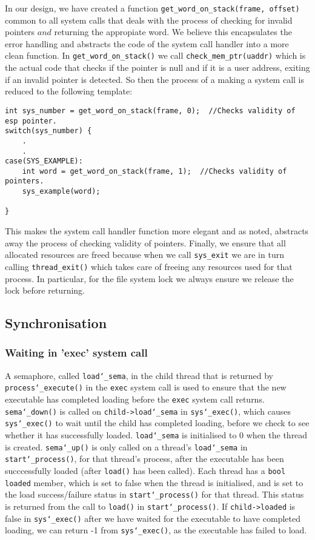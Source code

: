 \documentclass{article}
\renewcommand{\_}{\char`_}
\begin{document}
In our design, we have created a function  \lstinline{get_word_on_stack(frame, offset)} common to all system calls that deals with the process of checking for invalid pointers $and$ returning the appropiate word. We believe this encapsulates the error handling and abstracts the code of the system call handler into a more clean function. In \lstinline{get_word_on_stack()} we call \lstinline{check_mem_ptr(uaddr)} which is the actual code that checks if the pointer is null and if it is a user address, exiting if an invalid pointer is detected. So then the process of a making a system call is reduced to the following template:

\begin{lstlisting}
int sys_number = get_word_on_stack(frame, 0);  //Checks validity of esp pointer.
switch(sys_number) {
	.
	.
case(SYS_EXAMPLE):
	int word = get_word_on_stack(frame, 1);  //Checks validity of pointers.
	sys_example(word);

}
\end{lstlisting}

This makes the system call handler function more elegant and as noted, abstracts away the process of checking validity of pointers. Finally, we ensure that all allocated resources are freed because when we call \lstinline{sys_exit} we are in turn calling \lstinline{thread_exit()} which takes care of freeing any resources used for that process. In particular, for the file system lock we always ensure we release the lock before returning.

\subsection{Synchronisation}

\subsubsection{Waiting in 'exec' system call}

A semaphore, called \texttt{load\_sema}, in the child thread that is returned by \texttt{process\_execute()} in the \texttt{exec} system call is used to ensure that the new executable has completed loading before the \texttt{exec} system call returns. \texttt{sema\_down()} is called on \texttt{child->load\_sema} in \texttt{sys\_exec()}, which causes \texttt{sys\_exec()} to wait until the child has completed loading, before we check to see whether it has successfully loaded. \texttt{load\_sema} is initialised to 0 when the thread is created. \texttt{sema\_up()} is only called on a thread's \texttt{load\_sema} in \texttt{start\_process()}, for that thread's process, after the executable has been succcessfully loaded (after \texttt{load()} has been called). Each thread has a \texttt{bool loaded} member, which is set to false when the thread is initialised, and is set to the load success/failure status in \texttt{start\_process()} for that thread. This status is returned from the call to \texttt{load()} in \texttt{start\_process()}. If \texttt{child->loaded} is false in \texttt{sys\_exec()} after we have waited for the executable to have completed loading, we can return -1 from \texttt{sys\_exec()}, as the executable has failed to load.
\end{document}
